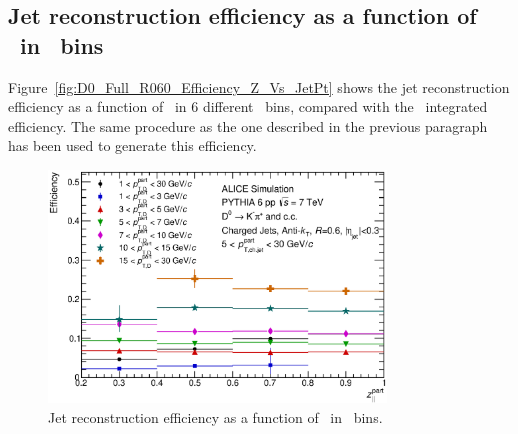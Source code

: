 \subsection{Jet reconstruction efficiency as a function of \zpargen\ in \ptdgen\ bins}
Figure~\ref{fig:D0_Full_R060_Efficiency_Z_Vs_JetPt} shows the jet reconstruction efficiency as a function of \zpargen\ in 6 different \ptdgen\ bins,
compared with the \ptdgen\ integrated efficiency. The same procedure as the one described in the previous paragraph has been used to generate
this efficiency.
\begin{figure}[tbh]
\begin{center}
\includegraphics[width=0.8\textwidth]{img/D0_Full_R060_Efficiency_Z_Vs_DPt}
 \caption{Jet reconstruction efficiency as a function of \zpargen\ in \ptdgen\ bins.} 
 \label{fig:D0_Full_R060_Efficiency_Z_Vs_DPt}
\end{center}
\end{figure}
